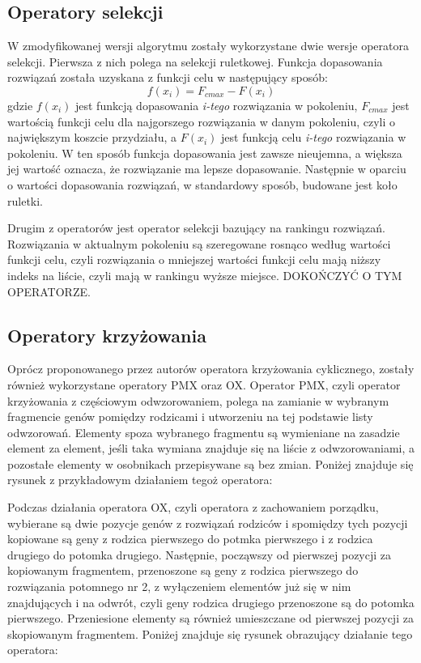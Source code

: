 \subsection{Operatory selekcji}
W zmodyfikowanej wersji algorytmu zostały wykorzystane dwie wersje operatora selekcji. Pierwsza z nich polega na selekcji ruletkowej. Funkcja dopasowania rozwiązań została uzyskana z funkcji celu w następujący sposób:
\newline
\begin{equation}
f(x_i)= F_{c max} - F(x_i)
\end{equation}
\newline
gdzie $f(x_i)$ jest funkcją dopasowania \textit{i-tego} rozwiązania w pokoleniu, $F_{c max}$ jest wartością funkcji celu dla najgorszego rozwiązania w danym pokoleniu, czyli o największym koszcie przydziału, a $F(x_i)$ jest funkcją celu \textit{i-tego} rozwiązania w pokoleniu. W ten sposób funkcja dopasowania jest zawsze nieujemna, a większa jej wartość oznacza, że rozwiązanie ma lepsze dopasowanie. Następnie w oparciu o wartości dopasowania rozwiązań, w standardowy sposób, budowane jest koło ruletki.

Drugim z operatorów jest operator selekcji bazujący na rankingu rozwiązań. Rozwiązania w aktualnym pokoleniu są szeregowane rosnąco według wartości funkcji celu, czyli rozwiązania o mniejszej wartości funkcji celu mają niższy indeks na liście, czyli mają w rankingu wyższe miejsce. DOKOŃCZYĆ O TYM OPERATORZE.

\subsection{Operatory krzyżowania}
Oprócz proponowanego przez autorów operatora krzyżowania cyklicznego, zostały również wykorzystane operatory PMX oraz OX.
Operator PMX, czyli operator krzyżowania z częściowym odwzorowaniem, polega na zamianie w wybranym fragmencie genów pomiędzy rodzicami i utworzeniu na tej podstawie listy odwzorowań. Elementy spoza wybranego fragmentu są wymieniane na zasadzie element za element, jeśli taka wymiana znajduje się na liście z odwzorowaniami, a pozostałe elementy w osobnikach przepisywane są bez zmian. Poniżej znajduje się rysunek z przykładowym działaniem tegoż operatora:

Podczas działania operatora OX, czyli operatora z zachowaniem porządku, wybierane są dwie pozycje genów z rozwiązań rodziców i spomiędzy tych pozycji kopiowane są geny z rodzica pierwszego do potmka pierwszego i z rodzica drugiego do potomka drugiego. Następnie, począwszy od pierwszej pozycji za kopiowanym fragmentem, przenoszone są geny z rodzica pierwszego do rozwiązania potomnego nr 2, z wyłączeniem elementów już się w nim znajdujących i na odwrót, czyli geny rodzica drugiego przenoszone są do potomka pierwszego. Przeniesione elementy są również umieszczane od pierwszej pozycji za skopiowanym fragmentem. Poniżej znajduje się rysunek obrazujący działanie tego operatora:

